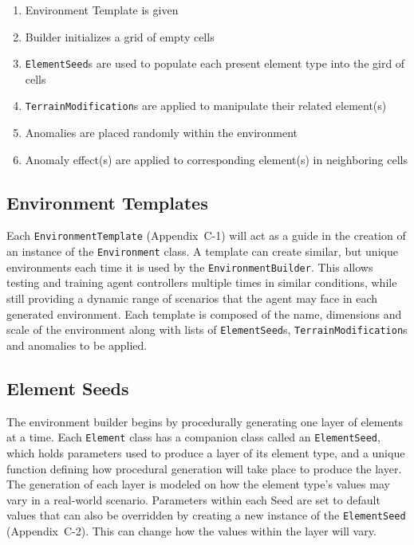 \begin{enumerate}
  \setlength\itemsep{-12pt}
  \item Environment Template is given
  \item	Builder initializes a grid of empty cells
  \item	\texttt{ElementSeed}s are used to populate each present element type into the gird of cells
  \item	\texttt{TerrainModification}s are applied to manipulate their related element(s)
  \item	Anomalies are placed randomly within the environment
  \item	Anomaly effect(s) are applied to corresponding element(s) in neighboring cells
\end{enumerate}


\subsection{Environment Templates} \label{subsec:environment_templates}
Each \texttt{EnvironmentTemplate} (Appendix~C-1) will act as a guide in the creation of an instance of the \texttt{Environment} class.
A template can create similar, but unique environments each time it is used by the \texttt{EnvironmentBuilder}.
This allows testing and training agent controllers multiple times in similar conditions, while still providing a dynamic range of scenarios that the agent may face in each generated environment.
Each template is composed of the name, dimensions and scale of the environment along with lists of \texttt{ElementSeed}s, \texttt{TerrainModification}s and anomalies to be applied.


\subsection{Element Seeds} \label{subsec:element_seeds}
The environment builder begins by procedurally generating one layer of elements at a time.
Each \texttt{Element} class has a companion class called an \texttt{ElementSeed}, which holds parameters used to produce a layer of its element type, and a unique function defining how procedural generation will take place to produce the layer.
The generation of each layer is modeled on how the element type's values may vary in a real-world scenario.
Parameters within each Seed are set to default values that can also be overridden by creating a new instance of the \texttt{ElementSeed} (Appendix~C-2).
This can change how the values within the layer will vary.


